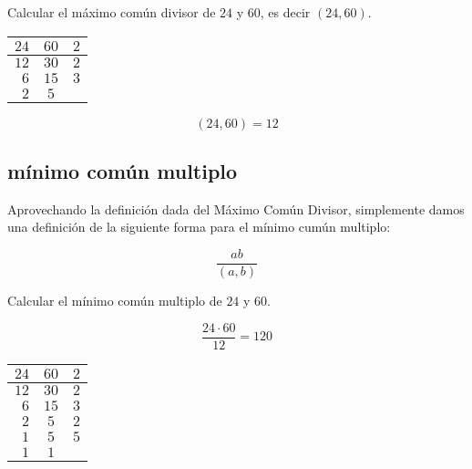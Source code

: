         \begin{ejemplo}
            Calcular el máximo común divisor de $24$ y $60$, es decir $(24, 60)$.

            \begin{center}
                    \begin{tabular}{r c | l}
                    $24$ & $60$ & $2$ \\
                    \hline
                    $12$ & $30$ & $2$ \\
                    $6$ & $15$ & $3$ \\
                    $2$ & $5$ & 
                \end{tabular}
            \end{center}

            \begin{equation*}
                (24, 60) = 12
            \end{equation*}
        \end{ejemplo}

    \newpage
    \subsection{mínimo común multiplo}

        \begin{definicion}
            Aprovechando la definición dada del Máximo Común Divisor, simplemente damos una definición de la siguiente forma para el mínimo cumún multiplo:

            \begin{equation}
                \frac{ab}{(a, b)}
            \end{equation}
        \end{definicion}

        \begin{ejemplo}
            Calcular el mínimo común multiplo de $24$ y $60$.

            \begin{equation*}
                \frac{24 \cdot 60}{12} = 120
            \end{equation*}

            \begin{center}
                    \begin{tabular}{r c | l}
                    $24$ & $60$ & $2$ \\
                    \hline
                    $12$ & $30$ & $2$ \\
                    $6$ & $15$ & $3$ \\
                    $2$ & $5$ & $2$ \\
                    $1$ & $5$ & $5$ \\
                    $1$ & $1$ & 
                \end{tabular}
            \end{center}
        \end{ejemplo}

